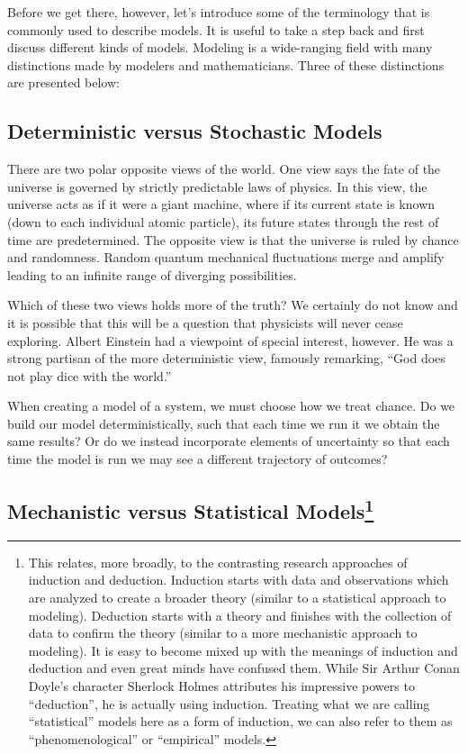 \documentclass[]{memoir}
\begin{document}
Before we get there, however, let's introduce some of the terminology
that is commonly used to describe models. It is useful to take a step
back and first discuss different kinds of models. Modeling is a
wide-ranging field with many distinctions made by modelers and
mathematicians. Three of these distinctions are presented below:

\subsection{Deterministic versus Stochastic Models}

There are two polar opposite views of the world. One view says the fate
of the universe is governed by strictly predictable laws of physics. In
this view, the universe acts as if it were a giant machine, where if its
current state is known (down to each individual atomic particle), its
future states through the rest of time are predetermined. The opposite
view is that the universe is ruled by chance and randomness. Random
quantum mechanical fluctuations merge and amplify leading to an infinite
range of diverging possibilities.

Which of these two views holds more of the truth? We certainly do not
know and it is possible that this will be a question that physicists
will never cease exploring. Albert Einstein had a viewpoint of special
interest, however. He was a strong partisan of the more deterministic
view, famously remarking, ``God does not play dice with the world.''

When creating a model of a system, we must choose how we treat chance.
Do we build our model deterministically, such that each time we run it
we obtain the same results? Or do we instead incorporate elements of
uncertainty so that each time the model is run we may see a different
trajectory of outcomes?

\subsection[Mechanistic versus Statistical Models]{Mechanistic versus
Statistical Models\footnote{This relates, more broadly, to the
  contrasting research approaches of induction and deduction. Induction
  starts with data and observations which are analyzed to create a
  broader theory (similar to a statistical approach to modeling).
  Deduction starts with a theory and finishes with the collection of
  data to confirm the theory (similar to a more mechanistic approach to
  modeling). It is easy to become mixed up with the meanings of
  induction and deduction and even great minds have confused them. While
  Sir Arthur Conan Doyle's character Sherlock Holmes attributes his
  impressive powers to ``deduction'', he is actually using induction.
  Treating what we are calling ``statistical'' models here as a form of
  induction, we can also refer to them as ``phenomenological'' or
  ``empirical'' models.}}
\end{document}

